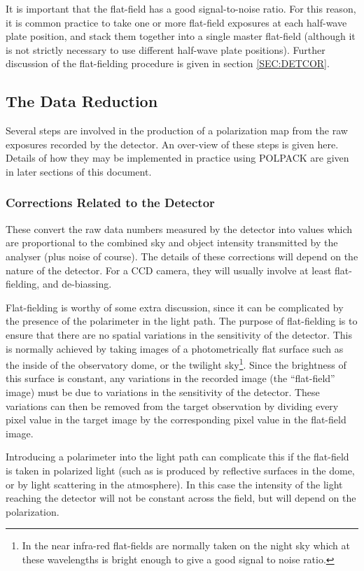 \documentclass[twoside,11pt]{article}
\newcommand{\hyperref}[4]{#2\ref{#4}#3}
\newcommand{\xlabel}[1]{}
\renewcommand{\_}{\texttt{\symbol{95}}}
\begin{document}
It is important that the flat-field has a good signal-to-noise ratio.
For this reason, it is common practice to take one or more flat-field 
exposures at each half-wave plate position, and stack them together into a 
single master flat-field (although it is not strictly necessary to use
different half-wave plate positions). Further discussion of the flat-fielding
procedure is given \hyperref{here}{in section }{}{SEC:DETCOR}. 

\subsection{\label{SEC:DBRED}\xlabel{thedatareduction}The Data Reduction}
Several steps are involved in the production of a polarization map from
the raw exposures recorded by the detector. An over-view of these steps
is given here. Details of how they may be implemented in practice using
POLPACK are given in later sections of this document.

\subsubsection{\label{SEC:DETCOR}Corrections Related to the Detector}
These convert the raw data numbers measured by the detector into values
which are proportional to the combined sky and object intensity
transmitted by the analyser (plus noise of course). The details of these
corrections will depend on the nature of the detector. For a CCD camera,
they will usually involve at least flat-fielding, and de-biassing. 

Flat-fielding is worthy of some extra discussion, since it can be
complicated by the presence of the polarimeter in the light path. The
purpose of flat-fielding is to ensure that there are no spatial
variations in the sensitivity of the detector. This is normally achieved
by taking images of a photometrically flat surface such as the inside of
the observatory dome, or the twilight sky\footnote{In the near infra-red
flat-fields are normally taken on the night sky which at these wavelengths
is bright enough to give a good signal to noise ratio.}. Since the
brightness of this surface is constant, any variations in the recorded
image (the ``flat-field'' image) must be due to variations in the
sensitivity of the detector. These variations can then be removed from the
target observation by dividing every pixel value in the target image by
the corresponding pixel value in the flat-field image.

Introducing a polarimeter into the light path can complicate this if the
flat-field is taken in polarized light (such as is produced by reflective
surfaces in the dome, or by light scattering in the atmosphere). In this
case the intensity of the light reaching the detector will not be
constant across the field, but will depend on the polarization. 
\end{document}

